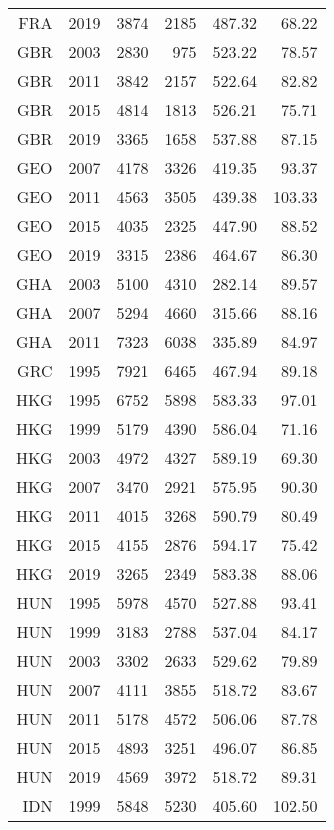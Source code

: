 \begin{longtable}{|r|r|r|r|r|r|}
    FRA   & 2019  & 3874  & 2185  & 487.32 & 68.22 \\
    GBR   & 2003  & 2830  & 975   & 523.22 & 78.57 \\
    GBR   & 2011  & 3842  & 2157  & 522.64 & 82.82 \\
    GBR   & 2015  & 4814  & 1813  & 526.21 & 75.71 \\
    GBR   & 2019  & 3365  & 1658  & 537.88 & 87.15 \\
    GEO   & 2007  & 4178  & 3326  & 419.35 & 93.37 \\
    GEO   & 2011  & 4563  & 3505  & 439.38 & 103.33 \\
    GEO   & 2015  & 4035  & 2325  & 447.90 & 88.52 \\
    GEO   & 2019  & 3315  & 2386  & 464.67 & 86.30 \\
    GHA   & 2003  & 5100  & 4310  & 282.14 & 89.57 \\
    GHA   & 2007  & 5294  & 4660  & 315.66 & 88.16 \\
    GHA   & 2011  & 7323  & 6038  & 335.89 & 84.97 \\
    GRC   & 1995  & 7921  & 6465  & 467.94 & 89.18 \\
    HKG   & 1995  & 6752  & 5898  & 583.33 & 97.01 \\
    HKG   & 1999  & 5179  & 4390  & 586.04 & 71.16 \\
    HKG   & 2003  & 4972  & 4327  & 589.19 & 69.30 \\
    HKG   & 2007  & 3470  & 2921  & 575.95 & 90.30 \\
    HKG   & 2011  & 4015  & 3268  & 590.79 & 80.49 \\
    HKG   & 2015  & 4155  & 2876  & 594.17 & 75.42 \\
    HKG   & 2019  & 3265  & 2349  & 583.38 & 88.06 \\
    HUN   & 1995  & 5978  & 4570  & 527.88 & 93.41 \\
    HUN   & 1999  & 3183  & 2788  & 537.04 & 84.17 \\
    HUN   & 2003  & 3302  & 2633  & 529.62 & 79.89 \\
    HUN   & 2007  & 4111  & 3855  & 518.72 & 83.67 \\
    HUN   & 2011  & 5178  & 4572  & 506.06 & 87.78 \\
    HUN   & 2015  & 4893  & 3251  & 496.07 & 86.85 \\
    HUN   & 2019  & 4569  & 3972  & 518.72 & 89.31 \\
    IDN   & 1999  & 5848  & 5230  & 405.60 & 102.50 \\

\end{longtable}
